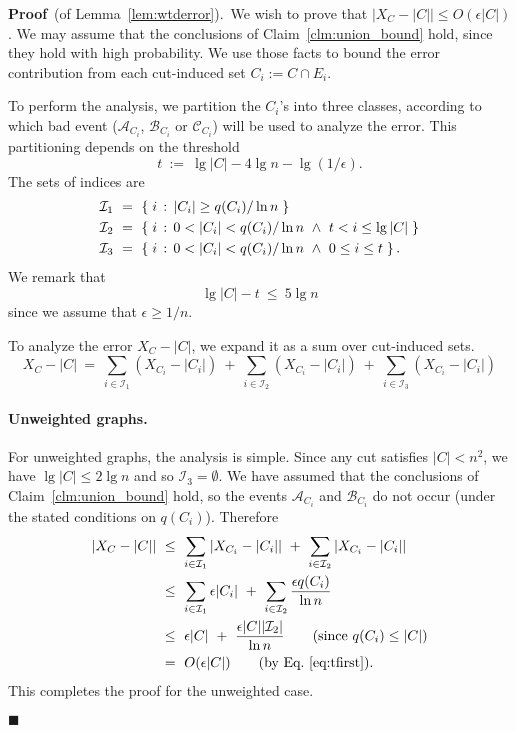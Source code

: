 \documentclass[11pt]{article}
\newcommand{\proofbelow}{8pt}
\numberwithin{equation}{section}
\newenvironment{proofof}[1]{\noindent\textbf{Proof} \,(of #1).\,}{\afterproof}
\newcommand{\afterproof}{\hfill $\blacksquare$ \par \vspace{\proofbelow}}
\newcommand{\cA}{\mathcal{A}}
\newcommand{\cB}{\mathcal{B}}
\newcommand{\cC}{\mathcal{C}}
\newcommand{\cI}{\mathcal{I}}
\newcommand{\eps}{\epsilon}
\newcommand{\intersect}{\cap}
\newcommand{\abs}[1]{\lvert #1 \rvert}
\newcommand{\card}[1]{\abs{#1}}
\newcommand{\Claim}[1]{Claim~\ref{clm:#1}}
\newcommand{\EquationName}[1]{\label{eq:#1}}
\newcommand{\Equation}[1]{Eq.~\eqref{eq:#1}}
\newcommand{\Lemma}[1]{Lemma~\ref{lem:#1}}
\begin{document}
\vspace{6pt}
\begin{proofof}{\Lemma{wtderror}}
We wish to prove that $|X_C - |C|| \leq O( \eps |C|)$.
We may assume that the conclusions of \Claim{union_bound} hold,
since they hold with high probability.
We use those facts to bound the error contribution from each cut-induced set
$C_i := C \intersect E_i$.

To perform the analysis, we partition the $C_i$'s into three classes,
according to which bad event ($\cA_{C_i}$, $\cB_{C_i}$ or $\cC_{C_i}$)
will be used to analyze the error.
This partitioning depends on the threshold
$$
    t ~:=~ \lg |C| - 4 \lg n - \lg(1/\eps).
$$
The sets of indices are
\begin{align*}
\cI_1 &~=~ \setst{ i }{ \card{C_i} \geq q(C_i)/\ln n } \\
\cI_2 &~=~ \setst{ i }{ 0 < \card{C_i} < q(C_i)/\ln n ~\wedge~ t < i \leq \lg |C| } \\
\cI_3 &~=~ \setst{ i }{ 0 < \card{C_i} < q(C_i)/\ln n ~\wedge~ 0 \leq i \leq t }.
\end{align*}
We remark that
\begin{equation}
    \EquationName{tfirst}
    \lg |C| - t ~\leq~ 5 \lg n
\end{equation}
since we assume that $\epsilon \geq 1/n$.

To analyze the error $X_C - |C|$, we expand it as a sum over cut-induced sets.
\begin{equation}
\EquationName{errorub}
    X_C - |C|
        ~=~ \sum_{i \in \cI_1} (X_{C_i} - |C_i|)
        ~+~ \sum_{i \in \cI_2} (X_{C_i} - |C_i|) 
        ~+~ \sum_{i \in \cI_3} (X_{C_i} - |C_i|) 
\end{equation}

\paragraph{Unweighted graphs.}
For unweighted graphs, the analysis is simple.
Since any cut satisfies $|C| < n^2$, we have $\lg |C| \leq 2 \lg n$ and so $\cI_3 = \emptyset$.
We have assumed that the conclusions of \Claim{union_bound} hold,
so the events $\cA_{C_i}$ and $\cB_{C_i}$ do not occur
(under the stated conditions on $q(C_i)$).
Therefore
\begin{align}
    \nonumber
    |X_C - |C||
        &~\leq~ \sum_{i \in \cI_1} |X_{C_i} - |C_i||
        ~+~ \sum_{i \in \cI_2} |X_{C_i} - |C_i||
        \\\nonumber
        &~\leq~ \sum_{i \in \cI_1} \epsilon |C_i|
        ~+~ \sum_{i \in \cI_2} \frac{ \epsilon q(C_i) }{ \ln n }
        \\\nonumber
        &~\leq~ \epsilon |C|
        ~+~ \frac{\epsilon |C|\card{\cI_2}}{\ln n} 
        \qquad\text{(since $q(C_i) \leq |C|$)} \\
        \EquationName{unwtd}
        &~=~ O(\epsilon |C|)
        \qquad\text{(by \Equation{tfirst}).}
\end{align}
This completes the proof for the unweighted case.



\end{proofof}
\end{document}
